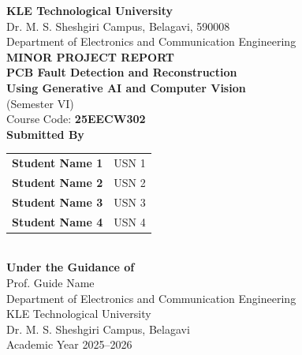 \documentclass[12pt,a4paper]{report}
\begin{document}
\begin{titlepage}
    \begin{center}
        \vspace*{0.5cm}

        {\Large \textbf{KLE Technological University}}\\
        {\large Dr. M. S. Sheshgiri Campus, Belagavi, 590008}\\[0.3cm]
        {\large Department of Electronics and Communication Engineering}\\[1.0cm]

        {\Large \textbf{MINOR PROJECT REPORT}}\\[0.8cm]

        {\Huge \textbf{PCB Fault Detection and Reconstruction}}\\[0.4cm]
        {\Large \textbf{Using Generative AI and Computer Vision}}\\[1.0cm]

        {\large (Semester VI)}\\[0.2cm]
        {\large Course Code: \textbf{25EECW302}}\\[1.0cm]

        {\large \textbf{Submitted By}}\\[0.3cm]
        \begin{tabular}{>{\bfseries}l l}
            Student Name 1 & USN 1\\
            Student Name 2 & USN 2\\
            Student Name 3 & USN 3\\
            Student Name 4 & USN 4\\
        \end{tabular}\\[1.0cm]

        {\large \textbf{Under the Guidance of}}\\[0.3cm]
        {\large Prof. Guide Name}\\
        {\large Department of Electronics and Communication Engineering}\\[1.0cm]

        {\large KLE Technological University}\\
        {\large Dr. M. S. Sheshgiri Campus, Belagavi}\\[0.5cm]
        {\large Academic Year 2025--2026}
    \end{center}
\end{titlepage}

\tableofcontents
\clearpage
{}
\end{document}
